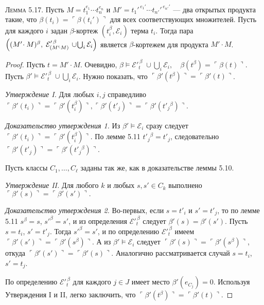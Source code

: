 \textsc{Лемма 5.17.}
Пусть 
\(M = t_{1}^{e_{1}}\!\cdots t_{n}^{e_{n}}\)
и
\(M' = t_{1}'^{\,e_{1}'}\!\cdots t_{n'}'^{\,e_{n'}'}\) —
два открытых продукта такие, что 
\(\beta(t_{i}) = \ulcorner\beta(t_{i}')\urcorner\)
для всех соответствующих множителей.
Пусть для каждого \(i\) задан $\beta$-кортеж 
\((t_{i}^{\beta},\mathcal E_{i})\) терма \(t_{i}\).
Тогда пара
\(
\Bigl((M'\!\cdot M)^{\beta},\;
      \mathcal E_{(M'\!\cdot M)}^{\prime\,\beta}
      \,\cup\!
      \bigcup_{i}\mathcal E_{i}\Bigr)
\)
является $\beta$-кортежем для продукта \(M'\!\cdot M\).

\begin{proof}
Пусть $t=M'\cdot M$. Очевидно, 
\(
  \beta\models\mathcal E'^{\,\beta}_{t}\;\cup\!\bigcup_i\mathcal E_i,
  \quad
  \beta(t^\beta)=\ulcorner\beta(t)\urcorner.
\)
Пусть $\beta'\models\mathcal E'^{\,\beta}_{t}\;\cup\!\bigcup_i\mathcal E_i$.  
Нужно показать, что $\ulcorner\beta'(t^\beta)\urcorner=\ulcorner\beta'(t)\urcorner$.

\medskip
\noindent\textit{Утверждение I.}
Для любых $i,j$ справедливо
\(
  \ulcorner\beta'(t_i)\urcorner=\ulcorner\beta'(t_i^\beta)\urcorner,
  \ulcorner\beta'(t'_j)\urcorner=\ulcorner\beta'(t'_j{}^\beta)\urcorner.
\)

\emph{Доказательство утверждения 1.}
Из $\beta'\models\mathcal E_i$ сразу следует
$\ulcorner\beta'(t_i)\urcorner=\ulcorner\beta'(t_i^\beta)\urcorner$.  
По лемме 5.11 $t'_j{}^\beta=t'_j$, следовательно
$\ulcorner\beta'(t'_j)\urcorner=\ulcorner\beta'(t'_j{}^\beta)\urcorner$.

Пусть классы $C_1,\dots,C_\ell$ заданы так же, как в доказательстве леммы 5.10.

\medskip
\noindent\textit{Утверждение II.}
Для любого $k$ и любых $s,s'\in C_k$ выполнено
\(
  \ulcorner\beta'(s)\urcorner=\ulcorner\beta'(s')\urcorner.
\)

\emph{Доказательство утверждения 2.}
Во-первых, если $s=t'_i$ и $s'=t'_j$, то по лемме 5.11
$s^\beta=s$, $s'^\beta=s'$, и из определения
$\mathcal E'^{\,\beta}_{t}$ следует $\beta'(s)=\beta'(s')$.  
Пусть $s=t_i$, $s'=t'_j$. Тогда $s'^\beta=s'$, и по определению
$\mathcal E'^{\,\beta}_{t}$ имеем
$\ulcorner\beta'(s')\urcorner=\ulcorner\beta'(s^\beta)\urcorner$. А из $\beta'\models\mathcal E_i$ следует
$\ulcorner\beta'(s)\urcorner=\ulcorner\beta'(s^\beta)\urcorner$, откуда $\ulcorner\beta'(s')\urcorner=\ulcorner\beta'(s)\urcorner$.  
Аналогично рассматривается случай $s=t_i$, $s'=t_j$.

\medskip
По определению $\mathcal E'^{\,\beta}_{t}$ для каждого $j\in J$ имеет место
$\beta'(e_{C_j})=0$.  
Используя Утверждения I и II, легко заключить, что
\(\ulcorner\beta'(t^\beta)\urcorner=\ulcorner\beta'(t)\urcorner\).
\end{proof}

